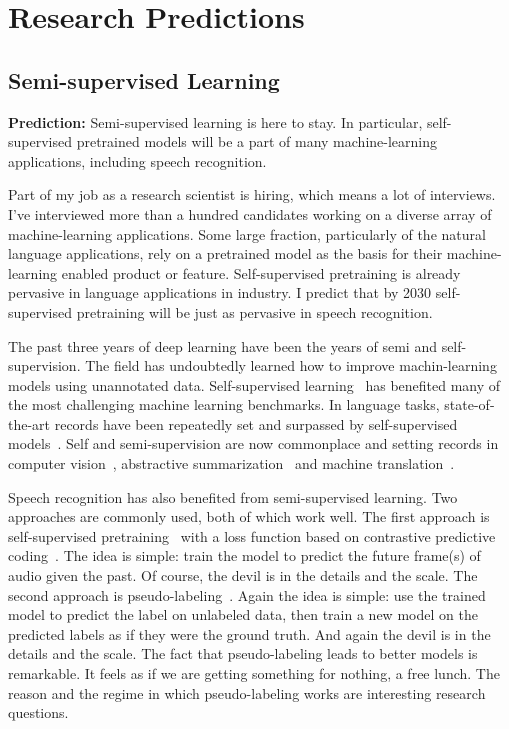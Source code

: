 \section{Research Predictions}
\label{sec:research_predictions}

\subsection{Semi-supervised Learning}

{\bf Prediction:} Semi-supervised learning is here to stay. In particular,
self-supervised pretrained models will be a part of many machine-learning
applications, including speech recognition.

Part of my job as a research scientist is hiring, which means a lot of
interviews. I've interviewed more than a hundred candidates working on a
diverse array of machine-learning applications. Some large fraction,
particularly of the natural language applications, rely on a pretrained model
as the basis for their machine-learning enabled product or feature.
Self-supervised pretraining is already pervasive in language applications in
industry. I predict that by 2030 self-supervised pretraining will be just as
pervasive in speech recognition.

The past three years of deep learning have been the years of semi and
self-supervision. The field has undoubtedly learned how to improve
machin-learning models using unannotated data. Self-supervised
learning~\cite{lecun2021self} has benefited many of the most challenging
machine learning benchmarks. In language tasks, state-of-the-art records have
been repeatedly set and surpassed by self-supervised
models~\citep{devlin2019bert, radford2019language, yang2019xlnet}. Self and
semi-supervision are now commonplace and setting records in computer
vision~\citep{he2020momentum, chen2020simple, grill2020bootstrap}, abstractive
summarization~\citep{zhang2020pegasus} and machine
translation~\citep{sennrich2016improving}.

Speech recognition has also benefited from semi-supervised learning. Two
approaches are commonly used, both of which work well. The first approach is
self-supervised pretraining~\citep{schneider2019wav2vec, zhang2020pushing} with
a loss function based on contrastive predictive
coding~\citep{oord2018representation}. The idea is simple: train the model to
predict the future frame(s) of audio given the past. Of course, the devil is in
the details and the scale. The second approach is
pseudo-labeling~\citep{lee2013pseudo, kahn2020self, xu2020iterative}. Again the
idea is simple: use the trained model to predict the label on unlabeled data,
then train a new model on the predicted labels as if they were the ground
truth. And again the devil is in the details and the scale. The fact
that pseudo-labeling leads to better models is remarkable. It feels as if we
are getting something for nothing, a free lunch. The reason and the regime in
which pseudo-labeling works are interesting research questions.

